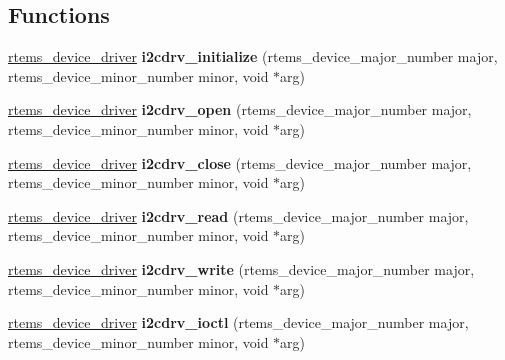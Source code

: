 \subsection*{Functions}
\begin{DoxyCompactItemize}
\item 
\mbox{\label{group__RTEMSBSPsARMCycVI2C_gaef2777f1513efa14bf9e347f2ccd62f4}} 
\mbox{\hyperlink{group__ClassicStatus_ga545d41846817eaba6143d52ee4d9e9fe}{rtems\+\_\+device\+\_\+driver}} {\bfseries i2cdrv\+\_\+initialize} (rtems\+\_\+device\+\_\+major\+\_\+number major, rtems\+\_\+device\+\_\+minor\+\_\+number minor, void $\ast$arg)
\item 
\mbox{\label{group__RTEMSBSPsARMCycVI2C_gad2116f38d9cf63bde300c7e053328d2e}} 
\mbox{\hyperlink{group__ClassicStatus_ga545d41846817eaba6143d52ee4d9e9fe}{rtems\+\_\+device\+\_\+driver}} {\bfseries i2cdrv\+\_\+open} (rtems\+\_\+device\+\_\+major\+\_\+number major, rtems\+\_\+device\+\_\+minor\+\_\+number minor, void $\ast$arg)
\item 
\mbox{\label{group__RTEMSBSPsARMCycVI2C_gab99d3d2d4217365936b0a07b54d95d14}} 
\mbox{\hyperlink{group__ClassicStatus_ga545d41846817eaba6143d52ee4d9e9fe}{rtems\+\_\+device\+\_\+driver}} {\bfseries i2cdrv\+\_\+close} (rtems\+\_\+device\+\_\+major\+\_\+number major, rtems\+\_\+device\+\_\+minor\+\_\+number minor, void $\ast$arg)
\item 
\mbox{\label{group__RTEMSBSPsARMCycVI2C_ga739a97010954c2aefff836ef6f11765d}} 
\mbox{\hyperlink{group__ClassicStatus_ga545d41846817eaba6143d52ee4d9e9fe}{rtems\+\_\+device\+\_\+driver}} {\bfseries i2cdrv\+\_\+read} (rtems\+\_\+device\+\_\+major\+\_\+number major, rtems\+\_\+device\+\_\+minor\+\_\+number minor, void $\ast$arg)
\item 
\mbox{\label{group__RTEMSBSPsARMCycVI2C_ga186be94fe37e86b11f9760f5e48379ba}} 
\mbox{\hyperlink{group__ClassicStatus_ga545d41846817eaba6143d52ee4d9e9fe}{rtems\+\_\+device\+\_\+driver}} {\bfseries i2cdrv\+\_\+write} (rtems\+\_\+device\+\_\+major\+\_\+number major, rtems\+\_\+device\+\_\+minor\+\_\+number minor, void $\ast$arg)
\item 
\mbox{\label{group__RTEMSBSPsARMCycVI2C_ga79ff9d418260b37109a8eb09063daef1}} 
\mbox{\hyperlink{group__ClassicStatus_ga545d41846817eaba6143d52ee4d9e9fe}{rtems\+\_\+device\+\_\+driver}} {\bfseries i2cdrv\+\_\+ioctl} (rtems\+\_\+device\+\_\+major\+\_\+number major, rtems\+\_\+device\+\_\+minor\+\_\+number minor, void $\ast$arg)
\end{DoxyCompactItemize}


